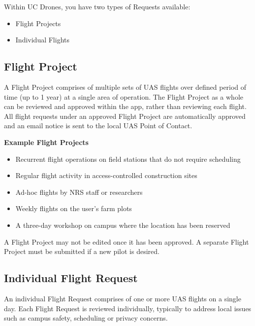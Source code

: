 \documentclass[
]{book}
\providecommand{\tightlist}{%
  \setlength{\itemsep}{0pt}\setlength{\parskip}{0pt}}
\begin{document}
Within UC Drones, you have two types of Requests available:

\begin{itemize}
\tightlist
\item
  Flight Projects
\item
  Individual Flights
\end{itemize}

\hypertarget{flight-project}{%
\subsection{Flight Project}\label{flight-project}}

A Flight Project comprises of multiple sets of UAS flights over defined period of time (up to 1 year) at a single area of operation. The Flight Project as a whole can be reviewed and approved within the app, rather than reviewing each flight. All flight requests under an approved Flight Project are automatically approved and an email notice is sent to the local UAS Point of Contact.

\textbf{Example Flight Projects}

\begin{itemize}
\tightlist
\item
  Recurrent flight operations on field stations that do not require scheduling
\item
  Regular flight activity in access-controlled construction sites
\item
  Ad-hoc flights by NRS staff or researchers
\item
  Weekly flights on the user's farm plots
\item
  A three-day workshop on campus where the location has been reserved
\end{itemize}

A Flight Project may not be edited once it has been approved. A separate Flight Project must be submitted if a new pilot is desired.

\hypertarget{individual-flight-request}{%
\subsection{Individual Flight Request}\label{individual-flight-request}}

An individual Flight Request comprises of one or more UAS flights on a single day. Each Flight Request is reviewed individually, typically to address local issues such as campus safety, scheduling or privacy concerns.
\end{document}
